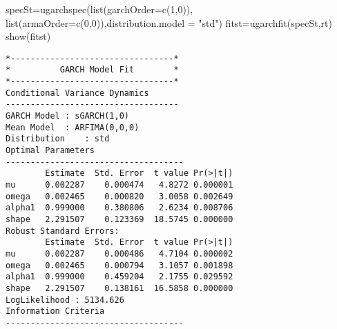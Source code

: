 \documentclass[
  ignorenonframetext,
]{beamer}
\newenvironment{Shaded}{\begin{snugshade}}{\end{snugshade}}
\newcommand{\AttributeTok}[1]{\textcolor[rgb]{0.77,0.63,0.00}{#1}}
\newcommand{\DecValTok}[1]{\textcolor[rgb]{0.00,0.00,0.81}{#1}}
\newcommand{\FunctionTok}[1]{\textcolor[rgb]{0.00,0.00,0.00}{#1}}
\newcommand{\NormalTok}[1]{#1}
\newcommand{\OtherTok}[1]{\textcolor[rgb]{0.56,0.35,0.01}{#1}}
\newcommand{\StringTok}[1]{\textcolor[rgb]{0.31,0.60,0.02}{#1}}
\newenvironment{Shaded}{\begin{snugshade}}{\end{snugshade}}
\newcommand{\AttributeTok}[1]{\textcolor[rgb]{0.77,0.63,0.00}{#1}}
\newcommand{\DecValTok}[1]{\textcolor[rgb]{0.00,0.00,0.81}{#1}}
\newcommand{\FunctionTok}[1]{\textcolor[rgb]{0.00,0.00,0.00}{#1}}
\newcommand{\NormalTok}[1]{#1}
\newcommand{\OtherTok}[1]{\textcolor[rgb]{0.56,0.35,0.01}{#1}}
\newcommand{\StringTok}[1]{\textcolor[rgb]{0.31,0.60,0.02}{#1}}
\begin{document}
\begin{frame}[fragile]
\begin{Shaded}
\begin{Highlighting}[]
\NormalTok{specSt}\OtherTok{=}\FunctionTok{ugarchspec}\NormalTok{(}\FunctionTok{list}\NormalTok{(}\AttributeTok{garchOrder=}\FunctionTok{c}\NormalTok{(}\DecValTok{1}\NormalTok{,}\DecValTok{0}\NormalTok{)), }\FunctionTok{list}\NormalTok{(}\AttributeTok{armaOrder=}\FunctionTok{c}\NormalTok{(}\DecValTok{0}\NormalTok{,}\DecValTok{0}\NormalTok{)),}\AttributeTok{distribution.model =} \StringTok{"std"}\NormalTok{)}
\NormalTok{fitst}\OtherTok{=}\FunctionTok{ugarchfit}\NormalTok{(specSt,rt)}
\FunctionTok{show}\NormalTok{(fitst)}
\end{Highlighting}
\end{Shaded}
\begin{verbatim}
*---------------------------------*
*          GARCH Model Fit        *
*---------------------------------*
Conditional Variance Dynamics   
-----------------------------------
GARCH Model : sGARCH(1,0)
Mean Model  : ARFIMA(0,0,0)
Distribution    : std 
Optimal Parameters
------------------------------------
        Estimate  Std. Error  t value Pr(>|t|)
mu      0.002287    0.000474   4.8272 0.000001
omega   0.002465    0.000820   3.0058 0.002649
alpha1  0.999000    0.380806   2.6234 0.008706
shape   2.291507    0.123369  18.5745 0.000000
Robust Standard Errors:
        Estimate  Std. Error  t value Pr(>|t|)
mu      0.002287    0.000486   4.7104 0.000002
omega   0.002465    0.000794   3.1057 0.001898
alpha1  0.999000    0.459204   2.1755 0.029592
shape   2.291507    0.138161  16.5858 0.000000
LogLikelihood : 5134.626 
Information Criteria
------------------------------------
                    

\end{verbatim}
\end{frame}
\end{document}
